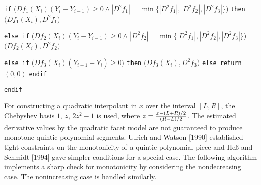 {\itemitem{} {\tt if} $\bigl(Df_1(X_i)(Y_i-Y_{i-1}) \ge 0 \wedge
  |D^2f_1| = \min\bigl\{ |D^2f_1|,
  |D^2f_2|, |D^2f_3|\bigr\} \bigr)$ {\tt then}
\itemitem{}  $\bigl(Df_1(X_i),D^2f_1\bigr)$

\itemitem{} {\tt else if} $\bigl(Df_2(X_i)(Y_i-Y_{i-1}) \ge 0 \wedge
  |D^2f_2| = \min\bigl\{ |D^2f_1|,
  |D^2f_2|, |D^2f_3|\bigr\} \bigr)$
\itemitem{}  $\bigl(Df_2(X_i),D^2f_2\bigr)$

\itemitem{} {\tt else if} $\bigl(Df_3(X_i)(Y_{i+1}-Y_i) \ge 0\bigr)$ {\tt then}
\itemitem{}  $\bigl(Df_3(X_i),D^2f_3\bigr)$
\itemitem{} {\tt else return} $(0, 0)$
\itemitem{} {\tt endif}
\item{} {\tt endif}
}
\vskip 5mm

For constructing a quadratic interpolant in $x$ over the interval
$[L,R]$, the Chebyshev basis $1$, $z$, $2z^2-1$ is used, where
$z={x-(L+R)/2 \over (R-L)/2}$. The estimated derivative values by the
quadratic facet model are not guaranteed to produce monotone quintic
polynomial segments. Ulrich and Watson [1990] established tight
constraints on the monotonicity of a quintic polynomial piece and
He{\ss} and Schmidt [1994] gave simpler conditions for a special case.
The following algorithm implements a sharp check for monotonicity by
considering the nondecreasing case. The nonincreasing case is handled
similarly.

